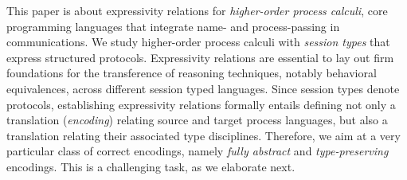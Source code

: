 \noi 
This paper is about expressivity relations for 
\emph{higher-order process calculi}, core programming languages that 
integrate name- and process-passing in communications.
We study higher-order process calculi with \emph{session types} that express structured protocols. 
Expressivity relations are essential to lay out firm foundations for the transference of reasoning techniques, notably behavioral equivalences, across different session typed languages.
Since session types denote protocols, 
 establishing expressivity relations formally entails defining 
 not only a translation (\emph{encoding})
relating source and target process languages, but also a translation 
relating their associated type disciplines. 
Therefore, we aim at a very particular class of correct encodings, namely \emph{fully abstract} and \emph{type-preserving} encodings.
This is a challenging task, as we elaborate next.


